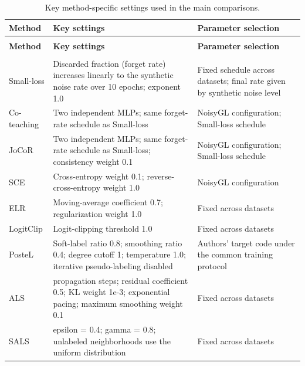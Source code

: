 \begingroup
\fontsize{9}{11}\selectfont
\setlength{\tabcolsep}{3pt}
\renewcommand{\arraystretch}{1.12}
\setlength{\TableWidth}{\dimexpr\linewidth-4\tabcolsep\relax}
\begin{longtable}{@{}>{\raggedright\arraybackslash}p{\dimexpr 0.200000\TableWidth\relax}>{\raggedright\arraybackslash}p{\dimexpr 0.500000\TableWidth\relax}>{\raggedright\arraybackslash}p{\dimexpr 0.300000\TableWidth\relax}@{}}
\caption{Key method-specific settings used in the main comparisons.}\label{tab:F.2}\\
\toprule
\textbf{Method} & \textbf{Key settings} & \textbf{Parameter selection} \\
\midrule\endfirsthead
\multicolumn{3}{l}{\small\itshape Table \thetable{} (continued)}\\
\toprule
\textbf{Method} & \textbf{Key settings} & \textbf{Parameter selection} \\
\midrule\endhead
\midrule\multicolumn{3}{r}{\small\itshape Continued on the next page}\\\endfoot
\bottomrule\endlastfoot
Small-loss & Discarded fraction (forget rate) increases linearly to the synthetic noise rate over 10 epochs; exponent 1.0 & Fixed schedule across datasets; final rate given by synthetic noise level \\
Co-teaching & Two independent MLPs; same forget-rate schedule as Small-loss & NoisyGL configuration; Small-loss schedule \\
JoCoR & Two independent MLPs; same forget-rate schedule as Small-loss; consistency weight 0.1 & NoisyGL configuration; Small-loss schedule \\
SCE & Cross-entropy weight 0.1; reverse-cross-entropy weight 1.0 & NoisyGL configuration \\
ELR & Moving-average coefficient 0.7; regularization weight 1.0 & Fixed across datasets \\
LogitClip & Logit-clipping threshold 1.0 & Fixed across datasets \\
PosteL & Soft-label ratio 0.8; smoothing ratio 0.4; degree cutoff 1; temperature 1.0; iterative pseudo-labeling disabled & Authors' target code under the common training protocol \\
ALS & 2 propagation steps; residual coefficient 0.5; KL weight 1e-3; exponential pacing; maximum smoothing weight 0.1 & Fixed across datasets \\
SALS & epsilon = 0.4; gamma = 0.8; unlabeled neighborhoods use the uniform distribution & Fixed across datasets \\

\end{longtable}
